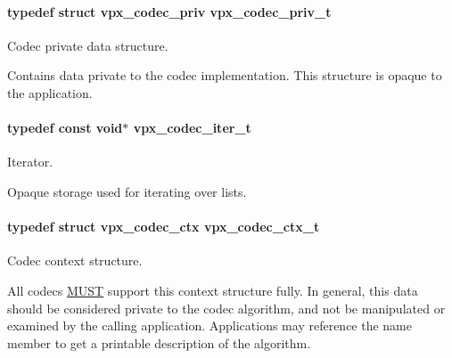 \paragraph[{\texorpdfstring{vpx\+\_\+codec\+\_\+priv\+\_\+t}{vpx_codec_priv_t}}]{\setlength{\rightskip}{0pt plus 5cm}typedef struct vpx\+\_\+codec\+\_\+priv {\bf vpx\+\_\+codec\+\_\+priv\+\_\+t}}\hypertarget{group__codec_ga1e262f91be9141a7176335fd409397ab}{}\label{group__codec_ga1e262f91be9141a7176335fd409397ab}


Codec private data structure. 

Contains data private to the codec implementation. This structure is opaque to the application. 
\paragraph[{\texorpdfstring{vpx\+\_\+codec\+\_\+iter\+\_\+t}{vpx_codec_iter_t}}]{\setlength{\rightskip}{0pt plus 5cm}typedef const void$\ast$ {\bf vpx\+\_\+codec\+\_\+iter\+\_\+t}}\hypertarget{group__codec_ga6ea348f76b1f8a1fe50e14db684146c6}{}\label{group__codec_ga6ea348f76b1f8a1fe50e14db684146c6}


Iterator. 

Opaque storage used for iterating over lists. 
\paragraph[{\texorpdfstring{vpx\+\_\+codec\+\_\+ctx\+\_\+t}{vpx_codec_ctx_t}}]{\setlength{\rightskip}{0pt plus 5cm}typedef struct {\bf vpx\+\_\+codec\+\_\+ctx}  {\bf vpx\+\_\+codec\+\_\+ctx\+\_\+t}}\hypertarget{group__codec_gad03e2dfa6ae511db7d25be6bbb336233}{}\label{group__codec_gad03e2dfa6ae511db7d25be6bbb336233}


Codec context structure. 

All codecs \hyperlink{rfc2119_MUST}{M\+U\+ST} support this context structure fully. In general, this data should be considered private to the codec algorithm, and not be manipulated or examined by the calling application. Applications may reference the \textquotesingle{}name\textquotesingle{} member to get a printable description of the algorithm. 

